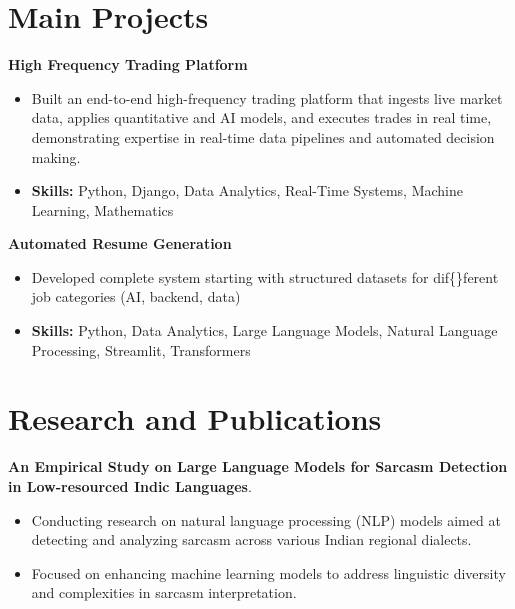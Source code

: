 \documentclass[a4paper,11pt]{article}
\begin{document}
\section{\textbf{Main Projects}}

\vspace{1mm}
  \textbf{High Frequency Trading Platform  }
\vspace{-1.5mm} %
\begin{itemize}
  \item Built an end-to-end high-frequency trading platform that ingests live market data, applies quantitative and AI models, and executes trades in real time, demonstrating expertise in real-time data pipelines and automated decision making.
\vspace{-3mm}
  \item \textbf{Skills:} Python, Django, Data Analytics, Real-Time Systems, Machine Learning, Mathematics
\end{itemize}


\vspace{1mm}
   \textbf{Automated Resume Generation }
\vspace{-1.5mm} %
\begin{itemize}
  \item Developed complete system starting with structured datasets for dif\{\}ferent job categories (AI, backend, data)
\vspace{-3mm}
  \item \textbf{Skills:} Python, Data Analytics, Large Language Models, Natural Language Processing, Streamlit, Transformers
\end{itemize}



\section{\textbf{Research and Publications} \hfill }
\vspace{1mm}
  \textbf{An Empirical Study on Large Language Models for Sarcasm Detection in Low-resourced Indic Languages}.
\vspace{-1mm} %
\begin{itemize}
  \item Conducting research on natural language processing (NLP) models aimed at detecting and analyzing sarcasm across various Indian regional dialects.
\vspace{-3mm}
  \item Focused on enhancing machine learning models to address linguistic diversity and complexities in sarcasm interpretation.
\end{itemize}
\end{document}
